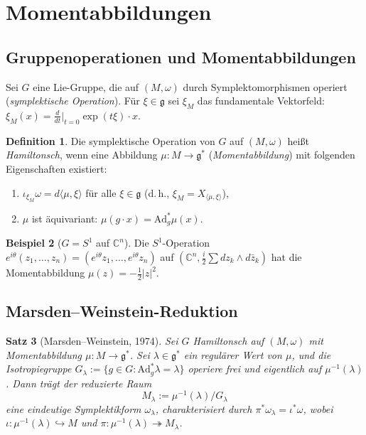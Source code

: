\documentclass[12pt,a4paper]{amsart}
\newtheorem{theorem}{Satz}[section]
\theoremstyle{definition}
\newtheorem{definition}[theorem]{Definition}
\newtheorem{beispiel}[theorem]{Beispiel}
\begin{document}
\section{Momentabbildungen}
\label{sec:moment}

\subsection{Gruppenoperationen und Momentabbildungen}

Sei $G$ eine Lie-Gruppe, die auf $(M, \omega)$ durch Symplektomorphismen
operiert (\emph{symplektische Operation}).  Für $\xi \in \mathfrak{g}$ sei
$\xi_M$ das fundamentale Vektorfeld: $\xi_M(x) = \frac{d}{dt}\big|_{t=0}
\exp(t\xi) \cdot x$.

\begin{definition}
Die symplektische Operation von $G$ auf $(M, \omega)$ heißt \emph{Hamiltonsch},
wenn eine Abbildung $\mu: M \to \mathfrak{g}^*$ (\emph{Momentabbildung}) mit
folgenden Eigenschaften existiert:
\begin{enumerate}[label=(\roman*)]
  \item $\iota_{\xi_M}\omega = d\langle \mu, \xi \rangle$ für alle
        $\xi \in \mathfrak{g}$ (d.\,h., $\xi_M = X_{\langle\mu,\xi\rangle}$),
  \item $\mu$ ist äquivariant: $\mu(g \cdot x) = \mathrm{Ad}^*_g \mu(x)$.
\end{enumerate}
\end{definition}

\begin{beispiel}[$G = S^1$ auf $\mathbb{C}^n$]
Die $S^1$-Operation $e^{i\theta}(z_1, \ldots, z_n) = (e^{i\theta}z_1, \ldots,
e^{i\theta}z_n)$ auf $(\mathbb{C}^n, \frac{i}{2}\sum dz_k \wedge d\bar{z}_k)$
hat die Momentabbildung $\mu(z) = -\frac{1}{2}|z|^2$.
\end{beispiel}

\subsection{Marsden--Weinstein-Reduktion}

\begin{theorem}[Marsden--Weinstein, 1974]\label{thm:mw}
Sei $G$ Hamiltonsch auf $(M, \omega)$ mit Momentabbildung $\mu: M \to
\mathfrak{g}^*$.  Sei $\lambda \in \mathfrak{g}^*$ ein regulärer Wert von
$\mu$, und die Isotropiegruppe $G_\lambda := \{g \in G : \mathrm{Ad}^*_g
\lambda = \lambda\}$ operiere frei und eigentlich auf $\mu^{-1}(\lambda)$.
Dann trägt der \emph{reduzierte Raum}
\[
  M_\lambda := \mu^{-1}(\lambda) / G_\lambda
\]
eine eindeutige Symplektikform $\omega_\lambda$, charakterisiert durch
$\pi^* \omega_\lambda = \iota^* \omega$, wobei $\iota: \mu^{-1}(\lambda)
\hookrightarrow M$ und $\pi: \mu^{-1}(\lambda) \twoheadrightarrow M_\lambda$.
\end{theorem}
\end{document}
